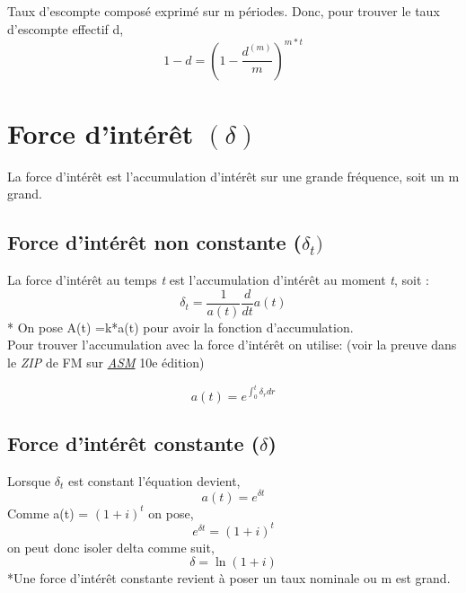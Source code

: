 \documentclass[11pt,french]{report}
\begin{document}
Taux d'escompte composé exprimé sur m périodes. Donc, pour trouver le taux d'escompte effectif d,
\begin{equation}
1 - d = (1 - \frac{d^{(m)}}{m})^{m*t} 
\end{equation}

\section{Force d'intérêt $(\delta)$}
\label{sec:force d'intérêt}
La force d'intérêt est l'accumulation d'intérêt sur une grande fréquence, soit un m grand.

\subsection{Force d'intérêt non constante ($\delta_t)$}
La force d'intérêt au temps \textit{t} est l'accumulation d'intérêt au moment \textit{t}, soit : 
\begin{equation}
\delta_t = \frac{1}{a(t)} \frac{d}{dt} a(t)
\end{equation}
* On pose A(t) =k*a(t) pour avoir la fonction d'accumulation. \\

Pour trouver l'accumulation avec la force d'intérêt on utilise: (voir la preuve dans le \emph{ZIP} de FM sur \href{https://drive.google.com/open?id=0B6kXivc6X9LIYUFKaHcxNmtiUUk}{\emph{ASM}} 10e édition)

\begin{equation}
a(t) = e^{\int_0^t \delta_r dr}
\end{equation}

\subsection{Force d'intérêt constante ($\delta$)}
Lorsque $\delta_t$ est constant l'équation devient,
\begin{equation}
a(t) = e^{\delta t}
\end{equation}
Comme a(t) = $(1+i)^t $
on pose, 
\begin{equation}
\label{eq:chap1:equation1}
e^{\delta t} = (1 + i)^t
\end{equation}
on peut donc isoler delta comme suit,
\begin{equation}
\label{chap1:équation delta}
\delta = \ln{(1 + i)}
\end{equation}
*Une force d'intérêt constante revient à poser un taux nominale ou m est grand.
\end{document}

